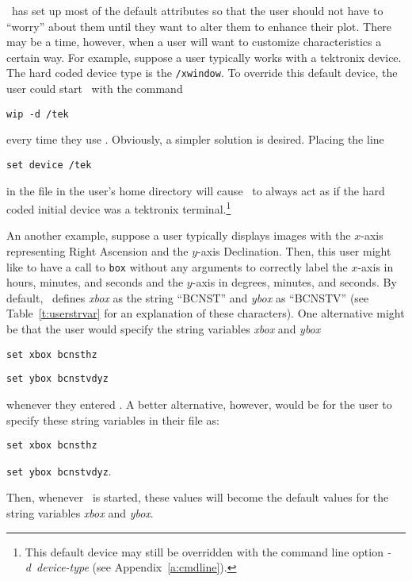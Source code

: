 %

\wip\ has set up most of the default attributes so that the user should
not have to ``worry'' about them until they want to alter them to
enhance their plot.
There may be a time, however, when a user will want to customize
characteristics a certain way.
For example, suppose a user typically works with
a tektronix device.
The hard coded device type is
the {\tt /xwindow}.
To override this default device, the user could start \wip\ with
the command
\begin{wiplist}%
  \item[\%] {\tt wip -d /tek}
\end{wiplist}
every time they use \wip.
Obviously, a simpler solution is desired.
Placing the line
\begin{wiplist}%
  \item[\ ] {\tt set device /tek}
\end{wiplist}
in the file \wipinit in the user's home directory
will cause \wip\ to always act as if the hard coded initial device was a
tektronix terminal.\footnote{This default device may still be overridden
with the command line option {\em -d~device-type}
(see Appendix~\ref{a:cmdline}).}

An another example, suppose a user typically displays images
with the $x$-axis representing Right Ascension and the $y$-axis Declination.
Then, this user might like to have a call to
{\tt box}
without any arguments to correctly label the $x$-axis in hours, minutes, and
seconds and the $y$-axis in degrees, minutes, and seconds.
By default, \wip\ defines
{\em xbox}
as the string ``BCNST'' and
{\em ybox}
as ``BCNSTV''
(see Table~\ref{t:userstrvar} for an explanation of these characters).
One alternative might be that
the user would specify the string variables
{\em xbox} and
{\em ybox}
\begin{wiplist}%
  \item {\tt set xbox bcnsthz}
\samepage
  \item {\tt set ybox bcnstvdyz}
\end{wiplist}
whenever they entered \wip.
A better alternative, however, would be for the user to specify
these string variables in their \wipinit file as:
\begin{wiplist}%
  \item[\ ] {\tt set xbox bcnsthz}
\samepage
  \item[\ ] {\tt set ybox bcnstvdyz}.
\end{wiplist}
Then, whenever \wip\ is started, these values will become the
default values for the string variables {\em xbox} and {\em ybox}.

